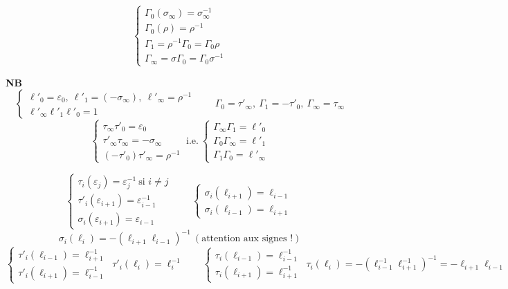 \documentclass[11pt,a4paper]{article}
\begin{document}
\[
\begin{cases}
\Gamma_0(\sigma_\infty) = \sigma_\infty^{-1} \\
\Gamma_0(\rho) = \rho^{-1} \\
\Gamma_1 = \rho^{-1}\Gamma_0 = \Gamma_0\rho \\
\Gamma_\infty = \sigma\Gamma_0 = \Gamma_0\sigma^{-1}
\end{cases}
\]

\textbf{NB}
\[
\begin{cases}
\ell'_0 = \varepsilon_0, \ \ell'_1 = (-\sigma_\infty), \ \ell'_\infty = \rho^{-1} \\
\ell'_\infty\ell'_1\ell'_0 = 1
\end{cases}
\qquad
\Gamma_0 = \tau'_\infty, \ \Gamma_1 = -\tau'_0, \ \Gamma_\infty = \tau_\infty
\]
\[
\begin{cases}
\tau_\infty\tau'_0 = \varepsilon_0 \\
\tau'_\infty\tau_\infty = -\sigma_\infty \\
(-\tau'_0)\tau'_\infty = \rho^{-1}
\end{cases}
\ \text{i.e.} \
\begin{cases}
\Gamma_\infty\Gamma_1 = \ell'_0 \\
\Gamma_0\Gamma_\infty = \ell'_1 \\
\Gamma_1\Gamma_0 = \ell'_\infty
\end{cases}
\]

\[
\begin{cases}
\tau_i(\varepsilon_j) = \varepsilon_j^{-1} \ \text{si } i \neq j \\
\tau'_i(\varepsilon_{i+1}) = \varepsilon_{i-1}^{-1} \\
\sigma_i(\varepsilon_{i+1}) = \varepsilon_{i-1}
\end{cases}
\qquad
\begin{cases}
\sigma_i(\ell_{i+1}) = \ell_{i-1} \\
\sigma_i(\ell_{i-1}) = \ell_{i+1}
\end{cases}
\]
\[
\sigma_i(\ell_i) = -(\ell_{i+1}\ell_{i-1})^{-1} \ (\text{attention aux signes !})
\]
\[
\begin{cases}
\tau'_i(\ell_{i-1}) = \ell_{i+1}^{-1} \\
\tau'_i(\ell_{i+1}) = \ell_{i-1}^{-1}
\end{cases}
\ \tau'_i(\ell_i) = \ell_i^{-1}
\qquad
\begin{cases}
\tau_i(\ell_{i-1}) = \ell_{i-1}^{-1} \\
\tau_i(\ell_{i+1}) = \ell_{i+1}^{-1}
\end{cases}
\ \tau_i(\ell_i) = -(\ell_{i-1}^{-1}\ell_{i+1}^{-1})^{-1} = -\ell_{i+1}\ell_{i-1}
\]
\end{document}

